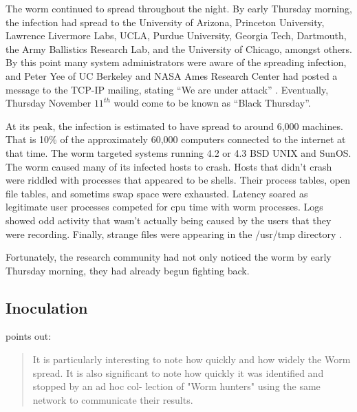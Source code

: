 The worm continued to spread throughout the night. By early Thursday morning,
the infection had spread to the University of Arizona, Princeton University,
Lawrence Livermore Labs, UCLA, Purdue University, Georgia Tech, Dartmouth,
the Army Ballistics Research Lab, and the University of Chicago, amongst others.
By this point many system administrators were aware of the spreading infection, and Peter Yee of UC Berkeley and NASA
Ames Research Center had posted a message to the TCP-IP mailing, stating ``We
are under attack''\cite{seeley_tour_1989}
\cite{spafford_internet_1989-1}. Eventually, Thursday November $11^{th}$ would
come to be known as ``Black Thursday''. 

At its peak, the infection is estimated to have spread to around 6,000 machines.
That is 10\% of the approximately 60,000 computers connected to the internet at
that time\cite{eichin_microscope_1989}\cite{marsan_morris_2008}. The worm
targeted systems running 4.2 or 4.3 BSD UNIX and SunOS. The worm
caused many of its infected hosts to crash.
Hosts that didn't crash were riddled with processes that appeared to be shells.
Their process tables, open file tables, and sometims swap space were exhausted.
Latency soared as legitimate user processes competed for cpu time with worm
processes. Logs showed odd activity that wasn't actually being caused by the
users that they were recording. Finally, strange files were appearing in the
/usr/tmp directory \cite{seeley_tour_1989}\cite{spafford_crisis_1989}.

Fortunately, the research community had not only noticed the worm by early
Thursday morning, they had already begun fighting back.



\subsection*{Inoculation}

\cite{spafford_internet_1989-1} points out:
\begin{quote}
It is particularly interesting to note how quickly and how widely the Worm spread.
It is also significant to note how quickly it was identified and stopped by an ad hoc col-
lection of "Worm hunters" using the same network to communicate their results.
\end{quote}

